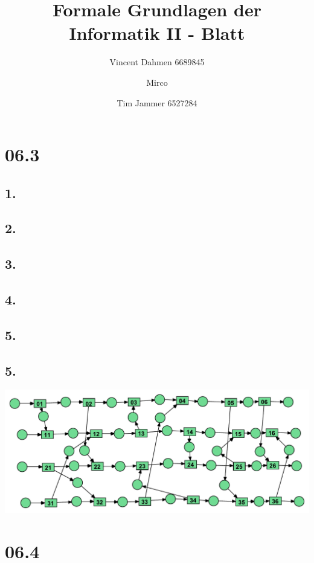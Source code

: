 \documentclass[12pt,a4paper]{article}
\title{Formale Grundlagen der Informatik II - Blatt \blattNr}
\author{Vincent Dahmen 6689845  \and Mirco \and Tim Jammer 6527284}
\def \blattNr{06}
\begin{document}
\maketitle{}

\section*{\blattNr .3}
\subsection*{1.}


\subsection*{2.}


\subsection*{3.}


\subsection*{4.}


\subsection*{5.}


\subsection*{5.}
\includegraphics[scale=0.75]{Teilaufgaben/Aufgabe1-6.pdf}

\pagebreak

\section*{\blattNr .4}
\end{document}

